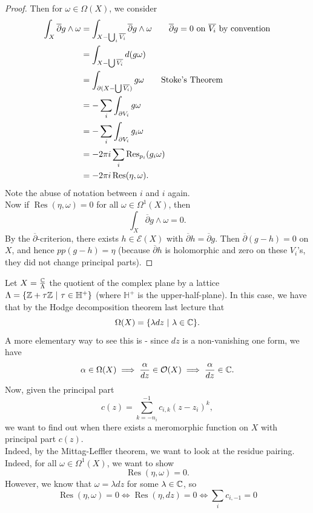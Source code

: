 \documentclass{article}
\begin{document}
{\begin{proof}
    Then for $\omega \in \Omega(X)$, we consider
    \begin{align*}
        \int_X \overline{\partial} g \wedge \omega &= \int_{X - \bigcup_i \overline{V_i}} \overline{\partial} g \wedge \omega \tag*{$\overline{\partial} g = 0$ on $\overline{V_i}$ by convention}\\
        &= \int_{X - \bigcup \overline{V_i}} d(g \omega)\\
        &= \int_{\partial(X - \bigcup \overline{V_i})} g \omega \tag*{Stoke's Theorem}\\
        &= - \sum_i \int_{\partial V_i} g \omega\\
        &= - \sum_i \int_{\partial V_i} g_i \omega\\
        &= - 2\pi i \sum_{i} \operatorname{Res}_{p_i}(g_i \omega)\\
        &= -2\pi i \operatorname{Res}(\eta, \omega).
    \end{align*}
    Note the abuse of notation between $i$ and $i$ again.\\

    Now if $\operatorname{Res}(\eta, \omega) = 0$ for all $\omega \in \Omega^{1}(X)$, then 
    \[\int_X \overline{\partial} g \wedge \omega = 0.\]
    By the $\overline{\partial}$-criterion, there exists $h \in \mathcal{E}(X)$ with $\overline{\partial} h = \overline{\partial} g$. Then $\overline{\partial}(g - h) = 0$ on $X$, and hence $pp(g - h) = \eta$ (because $\overline{\partial} h$ is holomorphic and zero on these $V_i$'s, they did not change principal parts).
\end{proof}

\begin{example}
Let $X = \frac{\mathbb{C}}{\Lambda}$ the quotient of the complex plane by a lattice $\Lambda = \{\mathbb{Z} + \tau \mathbb{Z}\ |\ \tau \in \mathbb{H}^+ \}$ (where $\mathbb{H}^+$ is the upper-half-plane). In this case, we have that by the Hodge decomposition theorem last lecture that
\[\Omega(X) = \{\lambda dz\ |\ \lambda \in \mathbb{C}\}.\]
A more elementary way to see this is - since $dz$ is a non-vanishing one form, we have 
\[\alpha \in \Omega(X) \implies \frac{\alpha}{dz} \in \mathcal{O}(X) \implies \frac{\alpha}{dz} \in \mathbb{C}.\]
Now, given the principal part
\[c(z) = \sum_{k = -n_i}^{-1} c_{i, k} (z - z_i)^k,\]
we want to find out when there exists a meromorphic function on $X$ with principal part $c(z)$.\\

Indeed, by the Mittag-Leffler theorem, we want to look at the residue pairing. Indeed, for all $\omega \in \Omega^1(X)$, we want to show
\[\operatorname{Res}(\eta, \omega) = 0.\]
However, we know that $\omega = \lambda dz$ for some $\lambda \in \mathbb{C}$, so
\[\operatorname{Res}(\eta, \omega) = 0 \iff \operatorname{Res}(\eta, dz) = 0 \iff \sum_{i} c_{i, -1} = 0\]
\end{example}

}
\end{document}
